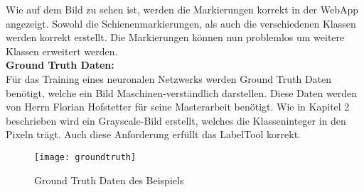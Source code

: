 \noindent
Wie auf dem Bild zu sehen ist, werden die Markierungen korrekt in der WebApp angezeigt. Sowohl die Schienenmarkierungen, als auch die verschiedenen Klassen werden korrekt erstellt. Die Markierungen können nun problemlos um weitere Klassen erweitert werden.
\\

\noindent
\textbf{Ground Truth Daten:}
\\

\noindent
Für das Training eines neuronalen Netzwerks werden Ground Truth Daten benötigt, welche ein Bild Maschinen-verständlich darstellen. Diese Daten werden von Herrn Florian Hofstetter für seine Masterarbeit benötigt. Wie in Kapitel 2 beschrieben wird ein Grayscale-Bild erstellt, welches die Klasseninteger in den Pixeln trägt. Auch diese Anforderung erfüllt das LabelTool korrekt.
\begin{figure}[H]
  \texttt{[image: groundtruth]}
  \caption{Ground Truth Daten des Beispiels}
\end{figure}
